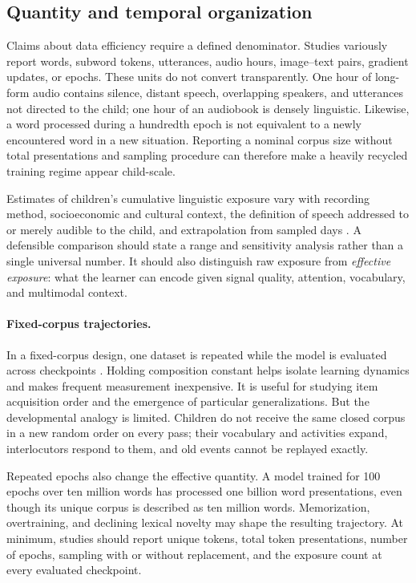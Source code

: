 \subsection{Quantity and temporal organization}
\label{sec:litreview:input-quantity}

Claims about data efficiency require a defined denominator. Studies variously report words, subword tokens, utterances, audio hours, image--text pairs, gradient updates, or epochs. These units do not convert transparently. One hour of long-form audio contains silence, distant speech, overlapping speakers, and utterances not directed to the child; one hour of an audiobook is densely linguistic. Likewise, a word processed during a hundredth epoch is not equivalent to a newly encountered word in a new situation. Reporting a nominal corpus size without total presentations and sampling procedure can therefore make a heavily recycled training regime appear child-scale.

Estimates of children's cumulative linguistic exposure vary with recording method, socioeconomic and cultural context, the definition of speech addressed to or merely audible to the child, and extrapolation from sampled days \citep{hart1992american,WeislederFernald2013,Frank2023}. A defensible comparison should state a range and sensitivity analysis rather than a single universal number. It should also distinguish raw exposure from \emph{effective exposure}: what the learner can encode given signal quality, attention, vocabulary, and multimodal context.

\paragraph{Fixed-corpus trajectories.}
In a fixed-corpus design, one dataset is repeated while the model is evaluated across checkpoints \citep{Chang2022,Evanson2023,Ma2024}. Holding composition constant helps isolate learning dynamics and makes frequent measurement inexpensive. It is useful for studying item acquisition order and the emergence of particular generalizations. But the developmental analogy is limited. Children do not receive the same closed corpus in a new random order on every pass; their vocabulary and activities expand, interlocutors respond to them, and old events cannot be replayed exactly.

Repeated epochs also change the effective quantity. A model trained for 100 epochs over ten million words has processed one billion word presentations, even though its unique corpus is described as ten million words. Memorization, overtraining, and declining lexical novelty may shape the resulting trajectory. At minimum, studies should report unique tokens, total token presentations, number of epochs, sampling with or without replacement, and the exposure count at every evaluated checkpoint.

